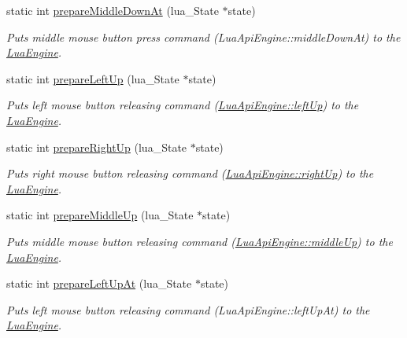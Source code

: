 \begin{DoxyCompactItemize}
static int \hyperlink{class_lua_api_engine_a6862d91bd6f2a46f7a86f0a5d19c7545}{prepare\-Middle\-Down\-At} (lua\-\_\-\-State $\ast$state)
\begin{DoxyCompactList}\small\item\em Puts middle mouse button press command (Lua\-Api\-Engine\-::middle\-Down\-At) to the \hyperlink{class_lua_engine}{Lua\-Engine}. \end{DoxyCompactList}\item 
static int \hyperlink{class_lua_api_engine_ad60b37dcca8dc42b6a70219b5b9fce95}{prepare\-Left\-Up} (lua\-\_\-\-State $\ast$state)
\begin{DoxyCompactList}\small\item\em Puts left mouse button releasing command (\hyperlink{class_lua_api_engine_a926f72169c400bb32186737f03208e1c}{Lua\-Api\-Engine\-::left\-Up}) to the \hyperlink{class_lua_engine}{Lua\-Engine}. \end{DoxyCompactList}\item 
static int \hyperlink{class_lua_api_engine_a6777e46c87e999bd66c4ae349a9078cf}{prepare\-Right\-Up} (lua\-\_\-\-State $\ast$state)
\begin{DoxyCompactList}\small\item\em Puts right mouse button releasing command (\hyperlink{class_lua_api_engine_ae8b09733792cc95ca22654be8074bfbf}{Lua\-Api\-Engine\-::right\-Up}) to the \hyperlink{class_lua_engine}{Lua\-Engine}. \end{DoxyCompactList}\item 
static int \hyperlink{class_lua_api_engine_a846fe811b326260da13425a8b9b6f908}{prepare\-Middle\-Up} (lua\-\_\-\-State $\ast$state)
\begin{DoxyCompactList}\small\item\em Puts middle mouse button releasing command (\hyperlink{class_lua_api_engine_a2cd4a53a99e262aa9d5e83a2b34b6538}{Lua\-Api\-Engine\-::middle\-Up}) to the \hyperlink{class_lua_engine}{Lua\-Engine}. \end{DoxyCompactList}\item 
static int \hyperlink{class_lua_api_engine_a6e63e8131106f5e01d445a564e6569f5}{prepare\-Left\-Up\-At} (lua\-\_\-\-State $\ast$state)
\begin{DoxyCompactList}\small\item\em Puts left mouse button releasing command (Lua\-Api\-Engine\-::left\-Up\-At) to the \hyperlink{class_lua_engine}{Lua\-Engine}. \end{DoxyCompactList}\item 

\end{DoxyCompactItemize}
